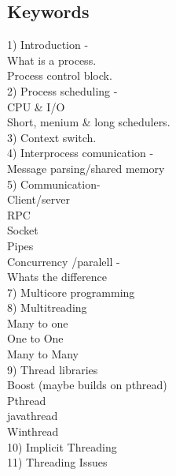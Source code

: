 \documentclass[a4paper,10pt,titlepage]{report}
\begin{document}
\subsection{Keywords}
1) Introduction - \\
\hspace{10mm}	What is a process. \\
\hspace{10mm}	Process control block. \\
2) Process scheduling - \\
\hspace{10mm}	CPU \& I/O\\
\hspace{10mm}	Short, menium \& long schedulers.\\
3) Context switch.\\
4) Interprocess comunication - \\
\hspace{10mm}	Message parsing/shared memory \\
5) Communication-\\
\hspace{10mm}	Client/server\\
\hspace{10mm}	RPC\\
\hspace{10mm}	Socket \\
\hspace{10mm}	Pipes\\
Concurrency /paralell - \\
\hspace{10mm} Whats the difference\\
7) Multicore programming \\
8) Multitreading \\
\hspace{10mm} Many to one \\
\hspace{10mm} One to One \\
\hspace{10mm} Many to Many \\	
9) Thread libraries \\
\hspace{10mm} Boost (maybe builds on pthread) \\
\hspace{10mm} Pthread \\
\hspace{10mm} javathread \\
\hspace{10mm} Winthread \\
10) Implicit Threading \\
11) Threading Issues \\
\newpage
\end{document}
